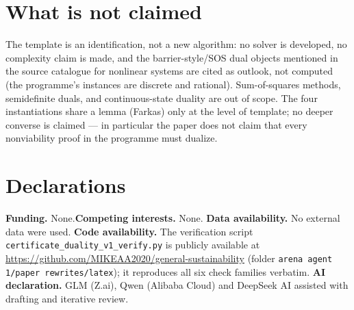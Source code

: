 \documentclass[10pt,twocolumn]{article}
\theoremstyle{definition}
\begin{document}
\section{What is not claimed}

The template is an identification, not a new algorithm: no solver is
developed, no complexity claim is made, and the barrier-style/SOS dual
objects mentioned in the source catalogue for nonlinear systems are cited
as outlook, not computed (the programme's instances are discrete and
rational). Sum-of-squares methods, semidefinite duals, and continuous-state
duality are out of scope. The four instantiations share a lemma (Farkas)
only at the level of template; no deeper converse is claimed --- in
particular the paper does not claim that every nonviability proof in the
programme must dualize.


\section*{Declarations}
\textbf{Funding.} None.\quad \textbf{Competing interests.} None.\quad
\textbf{Data availability.} No external data were used.\quad
\textbf{Code availability.} The verification script
\texttt{certificate\_duality\_v1\_verify.py} is publicly available at
\url{https://github.com/MIKEAA2020/general-sustainability} (folder
\texttt{arena agent 1/paper rewrites/latex}); it reproduces all six check
families verbatim.\quad
\textbf{AI declaration.} GLM (Z.ai), Qwen (Alibaba Cloud) and DeepSeek AI
assisted with drafting and iterative review.
\end{document}
